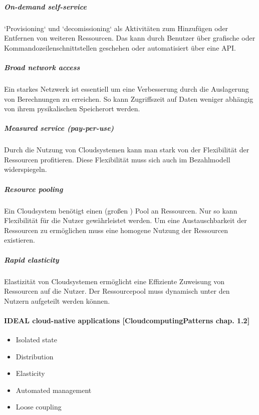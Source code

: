 \documentclass[a4paper,10pt]{article}
\numberwithin{figure}{section}
\numberwithin{table}{section}
\begin{document}
\subparagraph{On-demand self-service}
`Provisioning` und `decomissioning` als Aktivitäten zum Hinzufügen oder Entfernen von weiteren Ressourcen.
Das kann durch Benutzer über grafische oder Kommandozeilenschnittstellen geschehen oder automatisiert über eine API.
\subparagraph{Broad network access}
Ein starkes Netzwerk  ist essentiell um eine Verbesserung durch die Auslagerung von Berechnungen zu erreichen.
So kann Zugriffszeit auf Daten weniger abhängig von ihrem pysikalischen Speicherort werden.
\subparagraph{Measured service (pay-per-use)}
Durch die Nutzung von Cloudsystemen kann man stark von der Flexibilität der Ressourcen profitieren.
Diese Flexibilität muss sich auch im Bezahlmodell widerspiegeln.
\subparagraph{Resource pooling}
Ein Cloudsystem benötigt einen (großen ) Pool an Ressourcen.
Nur so kann Flexibilität für die Nutzer gewährleistet werden.
Um eine Austauschbarkeit der Ressourcen zu ermöglichen muss eine homogene Nutzung der Ressourcen existieren. 
\subparagraph{Rapid elasticity}
Elastizität von Cloudsystemen ermöglicht eine Effiziente Zuweisung von Ressourcen auf die Nutzer.
Der Ressourcepool muss dynamisch unter den Nutzern aufgeteilt werden können.

\paragraph{IDEAL cloud-native applications [CloudcomputingPatterns chap. 1.2]}

\begin{itemize}
 \item Isolated state
 \item Distribution
 \item Elasticity
 \item Automated management
 \item Loose coupling
\end{itemize}
\end{document}
